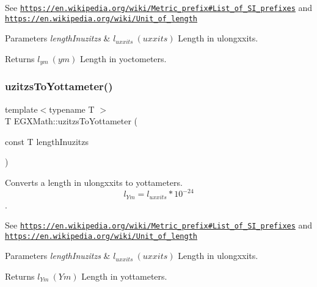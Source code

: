 See \href{https://en.wikipedia.org/wiki/Metric_prefix#List_of_SI_prefixes}{\tt https\+://en.\+wikipedia.\+org/wiki/\+Metric\+\_\+prefix\#\+List\+\_\+of\+\_\+\+S\+I\+\_\+prefixes} and \href{https://en.wikipedia.org/wiki/Unit_of_length}{\tt https\+://en.\+wikipedia.\+org/wiki/\+Unit\+\_\+of\+\_\+length} 
\begin{DoxyParams}{Parameters}
{\em length\+Inuzitzs} & $ l_{uxxits}\ (uxxits)$ Length in ulongxxits. \\
\hline
\end{DoxyParams}
\begin{DoxyReturn}{Returns}
$ l_{ym}\ (ym)$ Length in yoctometers. 
\end{DoxyReturn}
\mbox{\label{group___e_g_x_math-_conversions-_length_conversions-uzitzs-_s_i_gac20be4db1eed0397d7925d5b7148dd94}} 
\subsubsection{\texorpdfstring{uzitzs\+To\+Yottameter()}{uzitzsToYottameter()}}
{\footnotesize\ttfamily template$<$typename T $>$ \\
T E\+G\+X\+Math\+::uzitzs\+To\+Yottameter (\begin{DoxyParamCaption}\item[{const T}]{length\+Inuzitzs }\end{DoxyParamCaption})}



Converts a length in ulongxxits to yottameters. \[ l_{Ym}=l_{uxxits} * 10^{-24} \]. 

See \href{https://en.wikipedia.org/wiki/Metric_prefix#List_of_SI_prefixes}{\tt https\+://en.\+wikipedia.\+org/wiki/\+Metric\+\_\+prefix\#\+List\+\_\+of\+\_\+\+S\+I\+\_\+prefixes} and \href{https://en.wikipedia.org/wiki/Unit_of_length}{\tt https\+://en.\+wikipedia.\+org/wiki/\+Unit\+\_\+of\+\_\+length} 
\begin{DoxyParams}{Parameters}
{\em length\+Inuzitzs} & $ l_{uxxits}\ (uxxits)$ Length in ulongxxits. \\
\hline
\end{DoxyParams}
\begin{DoxyReturn}{Returns}
$ l_{Ym}\ (Ym)$ Length in yottameters. 
\end{DoxyReturn}
\mbox{\label{group___e_g_x_math-_conversions-_length_conversions-uzitzs-_s_i_ga9057f57c3f49216e6272c6f0f29ded62}} 

